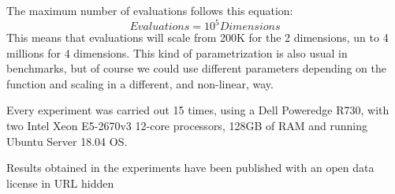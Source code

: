 \documentclass[runningheads]{llncs}
\begin{document}
The maximum number of evaluations follows this equation:
\begin{equation}
    \label{eq:hesitancy-interpretation}
   Evaluations = 10^{5} Dimensions
   \end{equation}
This means that evaluations will scale from 200K for the 2 dimensions,
un to 4 millions for 4 dimensions.  This kind of parametrization is
also usual in benchmarks, but of course we could use different
parameters depending on the function and scaling in a different, and
non-linear, way. 

Every experiment was carried out 15 times, using a Dell Poweredge
R730, with two Intel Xeon E5-2670v3 12-core processors, 128GB of RAM and
running Ubuntu Server 18.04 OS.

Results obtained in the experiments have been published with an open
data license in {URL hidden}
\end{document}
